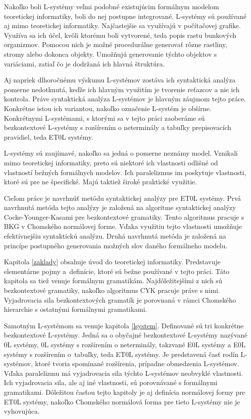 Nakoľko boli L-systémy veľmi podobné existujúcim formálnym modelom teoretickej informatiky, boli do nej postupne integrované. L-systémy sú používané aj mimo teoretickej informatiky. Najčastejšie sa využívajú v počítačovej grafike. Využíva sa ich účel, kvôli ktorému boli vytvorené, teda popis rastu bunkových organizmov. Pomocou nich je možné procedurálne generovať rôzne rastliny, stromy alebo dokonca objekty. Umožňujú generovanie týchto objektov s variáciami, zatiaľ čo je dodržaná ich hlavná štruktúra.

Aj napriek dlhoročnému výskumu L-systémov zostáva ich syntaktická analýza pomerne nedotknutá, keďže ich hlavným využitím je tvorenie reťazcov a nie ich kontrola. Práve syntaktická analýza L-systémov je hlavným záujmom tejto práce. Konkrétne istou ich variantou, nakoľko označenie L-systém je obšírne. Konkrétnymi L-systémami, s ktorými sa v tejto práci zaoberáme sú bezkontextové L-systémy s rozšírením o neterminály a tabuľky prepisovacích pravidiel, teda ET0L systémy.

L-systémy sú zaujímavé, nakoľko sa jedná o pomerne neznámy model. Vznikali mimo teoretickej informatiky, preto sú niektoré ich vlastnosti odlišné od vlastností bežných formálnych modelov. Ich paralelizmus im poskytuje vlastnosti, ktoré sú pre ne špecifické. Majú taktiež široké praktické využitie.

Cieľom práce je navrhnúť metódu syntaktickej analýzy pre ET0L systémy. Prvá navrhnutá metóda tejto analýzy je založená na algoritme syntaktickej analýzy Cocke-Younger-Kasami pre bezkontextové gramatiky. Tento algoritmus pracuje s BKG v Chomského normálovej forme. Vďaka využitiu tejto vlastnosti umožňuje efektívnejšiu syntaktickú analýzu. Druhá navrhnutá metóda je založená na princípe postupného generovania možných slov daného formálneho modelu.

Kapitola \ref{zaklady} obsahuje úvod do teoretickej informatiky. Predstavuje elementárne pojmy a~definície, ktoré sú bežne používané v tejto práci. Táto kapitola sa tiež venuje formálnym gramatikám. Najdôležitejšími z nich sú bezkontextové gramatiky, nakoľko algoritmus CYK pracuje práve s nimi. Vyjadrovacia sila bezkontextových gramatík je porovnaná v rámci Chomského hierarchie s ostatnými formálnymi gramatikami. 

Samotným L-systémom sa venuje kapitola \ref{lsystem}. Definované sú tri konkrétne bezkontextové L-systémy. Jedná sa o obyčajné bezkontextové L-systémy nazývané 0L systémy, 0L systémy s rozšírením o neterminály, takzvané E0L systémy a E0L systémy s rozšírením o~tabuľky, teda ET0L systémy. Je predstavená časť rodín L-systémov, ktoré tvoria spomínané rozšírenia, prípadne obmedzenia L-systémov. Vďaka paralelizmu má vyjadrovacia sila týchto L-systémov neobvyklé vlastnosti. Ich vyjadrovacia sila, ale aj iné vlastnosti, sú porovnávané s formálnymi gramatikami. Dôležitou časťou tejto kapitoly je aj definícia normálovej formy pre ET0L systémy, nakoľko Chomského normálová forma pre tieto L-systémy nie je vyhovujúca.

